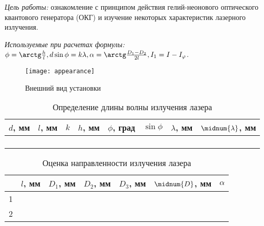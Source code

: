 \documentclass[10pt, pscyr, nonums]{hedlabwork}
\date{30.10.2013}
\begin{document}
    \makeheader

    \emph{Цель работы:} ознакомление с принципом действия гелий-неонового
    оптического квантового генератора (ОКГ) и изучение некоторых характеристик
    лазерного излучения.
    
    \emph{Используемые при расчетах формулы:}
    \( \phi = \arctg\frac{h}{l}, d\sin\phi = k\lambda,
        \alpha = \arctg\frac{D_1 - D_2}{2l}, I_1 = I - I_\varphi \).

    \begin{figure}[h!]
        \center
        \texttt{[image: appearance]}\\
        \parbox{.4\textwidth}{\caption{Внешний вид установки}}
    \end{figure}
    \vspace*{-2em}
    
    \begin{table}[h!]
        \center \caption{Определение длины волны излучения лазера}
        \begin{tabular}{|*{8}{C{.08}|}} \hline
            \( d \), мм & \( l \), мм & \( k \) & \( h \), мм &
                \( \phi \), град & \( \sin\phi \) & \( \lambda \), мм &
                \( \midnum{\lambda} \), мм \\ \hline
             &  &&&&&&
                 \\ 
            &&&&&&& \\ \hline
             &  &&&&&&
                 \\ 
            &&&&&&& \\ \hline
        \end{tabular}
    \end{table}
    
    \begin{table}[h!]
        \center \caption{Оценка направленности излучения лазера}
        \begin{tabular}{|*{7}{C{.08}|}} \hline
            & \( l \), мм & \( D_1 \), мм & \( D_2 \), мм & \( D_3 \), мм &
                \( \midnum{D} \), мм & \( \alpha \) \\  &  &&&&& \\ 
            2 &&&&&& \\ \hline
        \end{tabular}
    \end{table}
    
\end{document}
